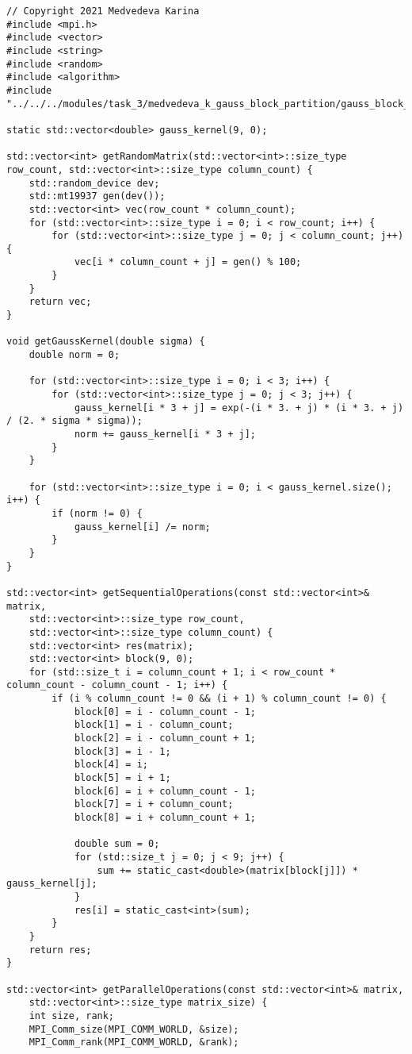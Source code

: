 \documentclass{report}
\begin{document}
\begin{lstlisting}
// Copyright 2021 Medvedeva Karina
#include <mpi.h>
#include <vector>
#include <string>
#include <random>
#include <algorithm>
#include "../../../modules/task_3/medvedeva_k_gauss_block_partition/gauss_block_partition.h"

static std::vector<double> gauss_kernel(9, 0);

std::vector<int> getRandomMatrix(std::vector<int>::size_type row_count, std::vector<int>::size_type column_count) {
    std::random_device dev;
    std::mt19937 gen(dev());
    std::vector<int> vec(row_count * column_count);
    for (std::vector<int>::size_type i = 0; i < row_count; i++) {
        for (std::vector<int>::size_type j = 0; j < column_count; j++) {
            vec[i * column_count + j] = gen() % 100;
        }
    }
    return vec;
}

void getGaussKernel(double sigma) {
    double norm = 0;

    for (std::vector<int>::size_type i = 0; i < 3; i++) {
        for (std::vector<int>::size_type j = 0; j < 3; j++) {
            gauss_kernel[i * 3 + j] = exp(-(i * 3. + j) * (i * 3. + j) / (2. * sigma * sigma));
            norm += gauss_kernel[i * 3 + j];
        }
    }

    for (std::vector<int>::size_type i = 0; i < gauss_kernel.size(); i++) {
        if (norm != 0) {
            gauss_kernel[i] /= norm;
        }
    }
}

std::vector<int> getSequentialOperations(const std::vector<int>& matrix,
    std::vector<int>::size_type row_count,
    std::vector<int>::size_type column_count) {
    std::vector<int> res(matrix);
    std::vector<int> block(9, 0);
    for (std::size_t i = column_count + 1; i < row_count * column_count - column_count - 1; i++) {
        if (i % column_count != 0 && (i + 1) % column_count != 0) {
            block[0] = i - column_count - 1;
            block[1] = i - column_count;
            block[2] = i - column_count + 1;
            block[3] = i - 1;
            block[4] = i;
            block[5] = i + 1;
            block[6] = i + column_count - 1;
            block[7] = i + column_count;
            block[8] = i + column_count + 1;

            double sum = 0;
            for (std::size_t j = 0; j < 9; j++) {
                sum += static_cast<double>(matrix[block[j]]) * gauss_kernel[j];
            }
            res[i] = static_cast<int>(sum);
        }
    }
    return res;
}

std::vector<int> getParallelOperations(const std::vector<int>& matrix,
    std::vector<int>::size_type matrix_size) {
    int size, rank;
    MPI_Comm_size(MPI_COMM_WORLD, &size);
    MPI_Comm_rank(MPI_COMM_WORLD, &rank);


\end{lstlisting}
\end{document}
